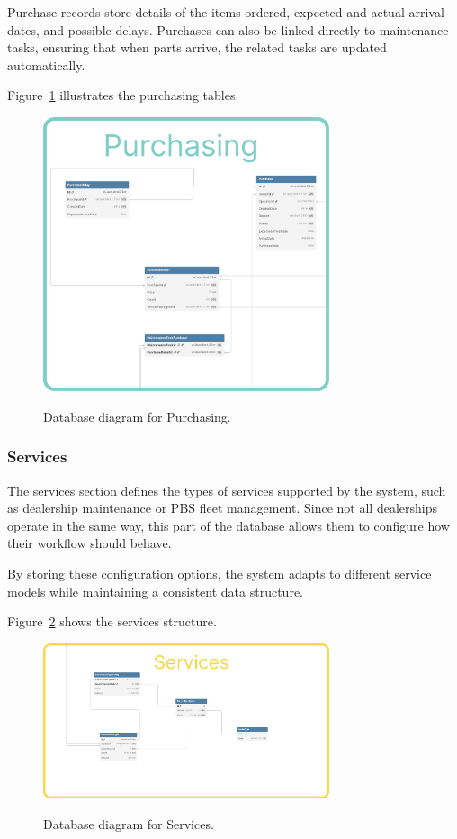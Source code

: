 Purchase records store details of the items ordered, expected and actual arrival dates, and possible delays. Purchases can also be linked directly to maintenance tasks, ensuring that when parts arrive, the related tasks are updated automatically.

Figure~\ref{fig:dbPurchasing} illustrates the purchasing tables.

\begin{figure}[h]
  \caption{Database diagram for Purchasing.}
  \centering
  \includegraphics[width=0.75\textwidth]{figs/dbDiagrams/Purchasing}
  \label{fig:dbPurchasing}
\end{figure}


\subsubsection{Services} 

The services section defines the types of services supported by the system, such as dealership maintenance or \acs{PBS} fleet management. Since not all dealerships operate in the same way, this part of the database allows them to configure how their workflow should behave.

By storing these configuration options, the system adapts to different service models while maintaining a consistent data structure.

Figure~\ref{fig:dbServices} shows the services structure.

\begin{figure}[h]
  \caption{Database diagram for Services.}
  \centering
  \includegraphics[width=0.75\textwidth]{figs/dbDiagrams/Services}
  \label{fig:dbServices}
\end{figure}


